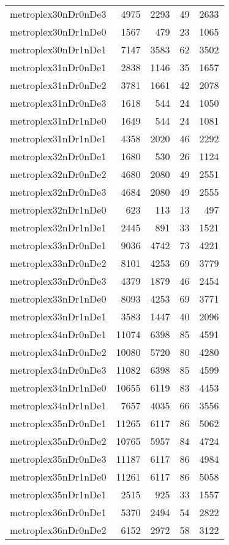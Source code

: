 \begin{longtable}{lrrrr}
metroplex30nDr0nDe3 & 4975 & 2293 & 49 & 2633 \\
metroplex30nDr1nDe0 & 1567 & 479 & 23 & 1065 \\
metroplex30nDr1nDe1 & 7147 & 3583 & 62 & 3502 \\
metroplex31nDr0nDe1 & 2838 & 1146 & 35 & 1657 \\
metroplex31nDr0nDe2 & 3781 & 1661 & 42 & 2078 \\
metroplex31nDr0nDe3 & 1618 & 544 & 24 & 1050 \\
metroplex31nDr1nDe0 & 1649 & 544 & 24 & 1081 \\
metroplex31nDr1nDe1 & 4358 & 2020 & 46 & 2292 \\
metroplex32nDr0nDe1 & 1680 & 530 & 26 & 1124 \\
metroplex32nDr0nDe2 & 4680 & 2080 & 49 & 2551 \\
metroplex32nDr0nDe3 & 4684 & 2080 & 49 & 2555 \\
metroplex32nDr1nDe0 & 623 & 113 & 13 & 497 \\
metroplex32nDr1nDe1 & 2445 & 891 & 33 & 1521 \\
metroplex33nDr0nDe1 & 9036 & 4742 & 73 & 4221 \\
metroplex33nDr0nDe2 & 8101 & 4253 & 69 & 3779 \\
metroplex33nDr0nDe3 & 4379 & 1879 & 46 & 2454 \\
metroplex33nDr1nDe0 & 8093 & 4253 & 69 & 3771 \\
metroplex33nDr1nDe1 & 3583 & 1447 & 40 & 2096 \\
metroplex34nDr0nDe1 & 11074 & 6398 & 85 & 4591 \\
metroplex34nDr0nDe2 & 10080 & 5720 & 80 & 4280 \\
metroplex34nDr0nDe3 & 11082 & 6398 & 85 & 4599 \\
metroplex34nDr1nDe0 & 10655 & 6119 & 83 & 4453 \\
metroplex34nDr1nDe1 & 7657 & 4035 & 66 & 3556 \\
metroplex35nDr0nDe1 & 11265 & 6117 & 86 & 5062 \\
metroplex35nDr0nDe2 & 10765 & 5957 & 84 & 4724 \\
metroplex35nDr0nDe3 & 11187 & 6117 & 86 & 4984 \\
metroplex35nDr1nDe0 & 11261 & 6117 & 86 & 5058 \\
metroplex35nDr1nDe1 & 2515 & 925 & 33 & 1557 \\
metroplex36nDr0nDe1 & 5370 & 2494 & 54 & 2822 \\
metroplex36nDr0nDe2 & 6152 & 2972 & 58 & 3122 \\

\end{longtable}
